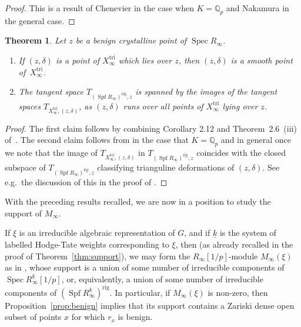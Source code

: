 \documentclass[JEP,XML,SOM,Unicode,NoEqCountersInSection]{cedram}
\newtheorem{thm}[prop]{Theorem}
\theoremstyle{definition}
\DeclareMathOperator{\Spf}{Spf}
\DeclareMathOperator{\Spec}{Spec}
\newcommand{\Q}{\mathbb{Q}}
\newcommand\rig{\mathrm{rig}}
\newcommand\tri{\mathrm{tri}}
\begin{document}
\begin{proof}
This is a result
of Chenevier \cite[Lem.\,4.4]{Chenevier} in the case when $K = \Q_p$
and Nakamura \cite[Lem.\,4.2]{Nakamura} in the general case.
\end{proof}

\begin{thm}
\label{thm:infinite fern}
Let $z$ be a benign crystalline point of $\Spec R_{\infty}$.
\begin{enumerate}
\item
If $(z,\delta)$ is a point of $X^{\tri}_{\infty}$ which
lies over $z$, then $(z,\delta)$ is a smooth point
of~$X^{\tri}_{\infty}$.
\item The tangent space
$T_{(\Spf R_{\infty})^{\rig}, z}$ is spanned by the
images of the tangent spaces $T_{X^{\tri}_{\infty}, (z,\delta)}$,
as $(z,\delta)$ runs over
all points of $X^{\tri}_{\infty}$ lying over $z$.
\end{enumerate}
\end{thm}

\begin{proof}
The first claim follows by combining
Corollary 2.12 and Theorem~2.6~(iii)
of~\cite{BHS}.
The second claim follows from \cite{Chenevier} in the case that $K
= \Q_p$ and \cite[Th.\,2.62]{Nakamura2} in general once we note that the image
of
$T_{X^{\tri}_{\infty}, (z,\delta)}$
in $T_{(\Spf R_{\infty})^{\rig}, z}$ coincides with the closed subspace of
$T_{(\Spf R_{\infty})^{\rig}, z}$
classifying trianguline deformations of $(z,\delta)$. See e.g.\
the discussion of this in the proof of \cite[Th.\,2.6]{BHS}.
\end{proof}

With the preceding results recalled,
we are now in a position to study the support of $M_{\infty}$.

If $\xi$ is an irreducible algebraic representation of $G$,
and if $\underline{k}$ is the system of labelled
Hodge-Tate weights corresponding to $\xi$,
then (as already recalled in the proof of Theorem~\ref{thm:support}),
we may form the $R_{\infty}[1/p]$-module $M_{\infty}(\xi)$
as in \cite{six-authors}, whose support is a union of some
number of irreducible components of $\Spec R_{\infty}^{\underline{k}}
[1/p]$, or, equivalently,
a union of some number of irreducible components of
$(\Spf R_{\infty}^{\underline{k}})^{\rig}$.
In particular, if $M_{\infty}(\xi)$ is non-zero,
then Proposition~\ref{prop:benign} implies that its support contains a
Zariski dense open subset of points $x$ for which $r_x$ is benign.
\end{document}
